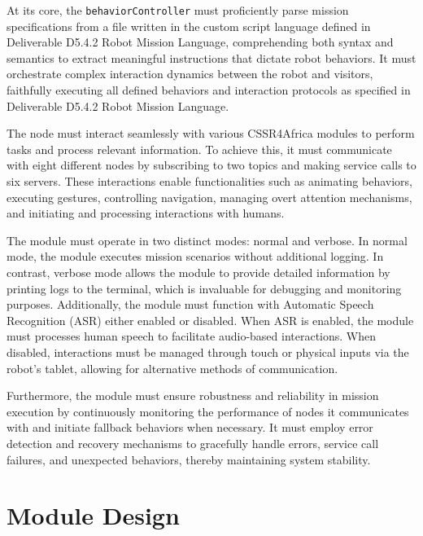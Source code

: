 \documentclass{CSSRforAfrica}
\begin{document}
At its core, the \texttt{\small behaviorController} must proficiently parse mission specifications from a file written in the custom script language defined in \textnormal{Deliverable D5.4.2 Robot Mission Language}, comprehending both syntax and semantics to extract meaningful instructions that dictate robot behaviors. It must orchestrate complex interaction dynamics between the robot and visitors, faithfully executing all defined behaviors and interaction protocols as specified in \textnormal{Deliverable D5.4.2 Robot Mission Language}.

The node must interact seamlessly with various CSSR4Africa modules to perform tasks and process relevant information. To achieve this, it must communicate with eight different nodes by subscribing to two topics and making service calls to six servers. These interactions enable functionalities such as animating behaviors, executing gestures, controlling navigation, managing overt attention mechanisms, and initiating and processing interactions with humans.

The module must operate in two distinct modes: normal and verbose. In normal mode, the module executes mission scenarios without additional logging. In contrast, verbose mode allows the module to provide detailed information by printing logs to the terminal, which is invaluable for debugging and monitoring purposes. Additionally, the module must function with Automatic Speech Recognition (ASR) either enabled or disabled. When ASR is enabled, the module must processes human speech to facilitate audio-based interactions. When disabled, interactions must be managed through touch or physical inputs via the robot’s tablet, allowing for alternative methods of communication.

Furthermore, the module must ensure robustness and reliability in mission execution by continuously monitoring the performance of nodes it communicates with and initiate fallback behaviors when necessary. It must employ  error detection and recovery mechanisms to gracefully handle errors, service call failures, and unexpected behaviors, thereby maintaining system stability.


\newpage
\section{Module Design}
\end{document}
